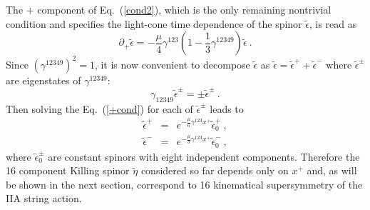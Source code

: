 \documentclass[a4paper,12pt]{article}
\begin{document}
The $+$ component of Eq.~(\ref{cond2}), which is the only remaining
nontrivial condition and specifies the light-cone time dependence of
the spinor $\tilde{\epsilon}$, is read as
\begin{equation}
\partial_+ \tilde{\epsilon}
 = -\frac{\mu}{4}\gamma^{123}
   (1-\frac{1}{3}\gamma^{12349})\tilde{\epsilon}~.
\label{+cond}
\end{equation}
Since $(\gamma^{12349})^2=1$, it is now convenient to decompose
$\tilde{\epsilon}$ as $\tilde{\epsilon}=\tilde{\epsilon}^+ +
\tilde{\epsilon}^-$ where $\tilde{\epsilon}^\pm$ are eigenstates of
$\gamma^{12349}$:
\begin{equation}
\gamma_{12349}\tilde{\epsilon}^{\pm} 
 = \pm \tilde{\epsilon}^{\pm}~.
\end{equation}
Then solving the Eq.~(\ref{+cond}) for each of $\tilde{\epsilon}^\pm$
leads to
\begin{eqnarray}
\tilde{\epsilon}^+ 
  &=& e^{-\frac{\mu}{6}\gamma^{123}x^+} \tilde{\epsilon}_0^+~, 
                                        \nonumber \\
\tilde{\epsilon}^- 
  &=& e^{-\frac{\mu}{3}\gamma^{123}x^+} \tilde{\epsilon}_0^-~,
\end{eqnarray}
where $\tilde{\epsilon}_0^{\pm}$ are constant spinors with eight
independent components. Therefore the 16 component Killing spinor
$\tilde{\eta}$ considered so far depends only on $x^+$ and, as will be
shown in the next section, correspond to 16 kinematical supersymmetry
of the IIA string action.
\end{document}
